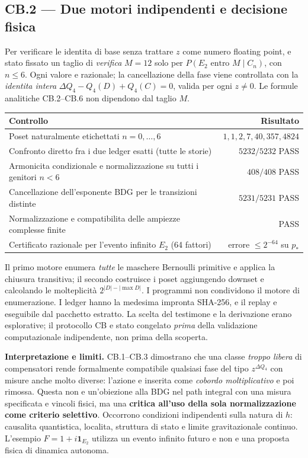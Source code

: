 \documentclass[11pt,a4paper]{article}
\begin{document}
\clearpage
\subsection*{CB.2 --- Due motori indipendenti e decisione fisica}
Per verificare le identita di base senza trattare $z$ come numero floating point, e stato fissato un taglio di \emph{verifica} $M=12$ solo per $P(E_2\text{ entro }M\mid C_n)$, con $n\le6$. Ogni valore e razionale; la cancellazione della fase viene controllata con la \emph{identita intera} $\Delta Q_4-Q_4(D)+Q_4(C)=0$, valida per ogni $z\neq0$. Le formule analitiche CB.2--CB.6 non dipendono dal taglio $M$.

\begin{center}\small
\begin{tabular}{p{10.4cm}r}
\toprule
Controllo & Risultato\\
\midrule
Poset naturalmente etichettati $n=0,\ldots,6$ & $1,1,2,7,40,357,4824$\\
Confronto diretto fra i due ledger esatti (tutte le storie) & $5232/5232$ PASS\\
Armonicita condizionale e normalizzazione su tutti i genitori $n<6$ & $408/408$ PASS\\
Cancellazione dell'esponente BDG per le transizioni distinte & $5231/5231$ PASS\\
Normalizzazione e compatibilita delle ampiezze complesse finite & PASS\\
Certificato razionale per l'evento infinito $E_2$ (64 fattori) & errore $\le2^{-64}$ su $p_*$\\
\bottomrule
\end{tabular}
\end{center}
Il primo motore enumera \emph{tutte} le maschere Bernoulli primitive e applica la chiusura transitiva; il secondo costruisce i poset aggiungendo downset e calcolando le molteplicit\`a $2^{|D|-|\max D|}$. I programmi non condividono il motore di enumerazione. I ledger hanno la medesima impronta SHA-256, e il replay e eseguibile dal pacchetto estratto. La scelta del testimone e la derivazione erano esplorative; il protocollo CB e stato congelato \emph{prima} della validazione computazionale indipendente, non prima della scoperta.

\textbf{Interpretazione e limiti.} CB.1--CB.3 dimostrano che una classe \emph{troppo libera} di compensatori rende formalmente compatibile qualsiasi fase del tipo $z^{\Delta Q_4}$ con misure anche molto diverse: l'azione e inserita come \emph{cobordo moltiplicativo} e poi rimossa. Questa non e un'obiezione alla BDG nel path integral con una misura specificata e vincoli fisici, ma una \textbf{critica all'uso della sola normalizzazione come criterio selettivo}. Occorrono condizioni indipendenti sulla natura di $h$: causalita quantistica, localita, struttura di stato e limite gravitazionale continuo. L'esempio $F=1+i\mathbf1_{E_2}$ utilizza un evento infinito futuro e non e una proposta fisica di dinamica autonoma.
\end{document}
